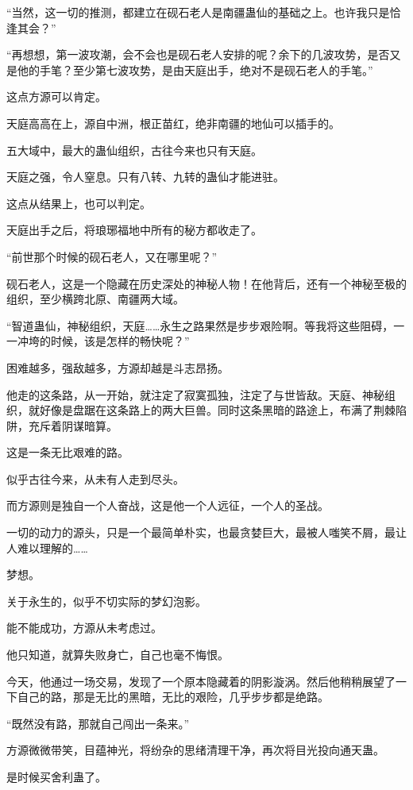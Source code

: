 \begin{this_body}
“当然，这一切的推测，都建立在砚石老人是南疆蛊仙的基础之上。也许我只是恰逢其会？”

“再想想，第一波攻潮，会不会也是砚石老人安排的呢？余下的几波攻势，是否又是他的手笔？至少第七波攻势，是由天庭出手，绝对不是砚石老人的手笔。”

这点方源可以肯定。

天庭高高在上，源自中洲，根正苗红，绝非南疆的地仙可以插手的。

五大域中，最大的蛊仙组织，古往今来也只有天庭。

天庭之强，令人窒息。只有八转、九转的蛊仙才能进驻。

这点从结果上，也可以判定。

天庭出手之后，将琅琊福地中所有的秘方都收走了。

“前世那个时候的砚石老人，又在哪里呢？”

砚石老人，这是一个隐藏在历史深处的神秘人物！在他背后，还有一个神秘至极的组织，至少横跨北原、南疆两大域。

“智道蛊仙，神秘组织，天庭……永生之路果然是步步艰险啊。等我将这些阻碍，一一冲垮的时候，该是怎样的畅快呢？”

困难越多，强敌越多，方源却越是斗志昂扬。

他走的这条路，从一开始，就注定了寂寞孤独，注定了与世皆敌。天庭、神秘组织，就好像是盘踞在这条路上的两大巨兽。同时这条黑暗的路途上，布满了荆棘陷阱，充斥着阴谋暗算。

这是一条无比艰难的路。

似乎古往今来，从未有人走到尽头。

而方源则是独自一个人奋战，这是他一个人远征，一个人的圣战。

一切的动力的源头，只是一个最简单朴实，也最贪婪巨大，最被人嗤笑不屑，最让人难以理解的……

梦想。

关于永生的，似乎不切实际的梦幻泡影。

能不能成功，方源从未考虑过。

他只知道，就算失败身亡，自己也毫不悔恨。

今天，他通过一场交易，发现了一个原本隐藏着的阴影漩涡。然后他稍稍展望了一下自己的路，那是无比的黑暗，无比的艰险，几乎步步都是绝路。

“既然没有路，那就自己闯出一条来。”

方源微微带笑，目蕴神光，将纷杂的思绪清理干净，再次将目光投向通天蛊。

是时候买舍利蛊了。

\end{this_body}

